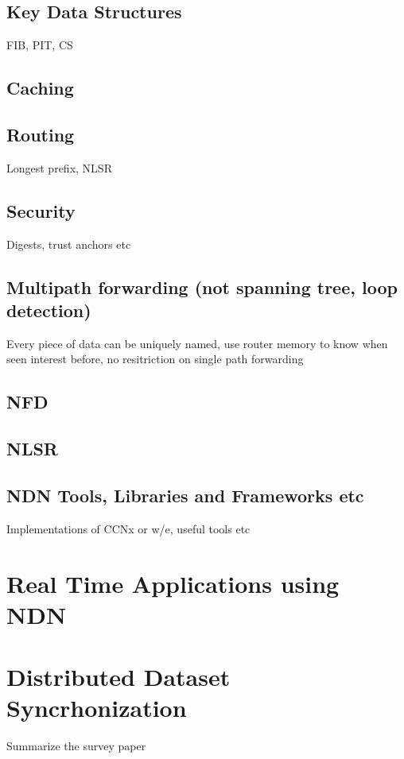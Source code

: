 \subsection{Key Data Structures}
FIB, PIT, CS

\subsection{Caching}


\subsection{Routing}
Longest prefix, NLSR 


\subsection{Security}
Digests, trust anchors etc


\subsection{Multipath forwarding (not spanning tree, loop detection)}
Every piece of data can be uniquely named, use router memory to know when seen interest before, no resitriction on single path forwarding

\subsection{NFD}


\subsection{NLSR}


\subsection{NDN Tools, Libraries and Frameworks etc}
Implementations of CCNx or w/e, useful tools etc





\section{Real Time Applications using NDN}

\section{Distributed Dataset Syncrhonization}
Summarize the survey paper
